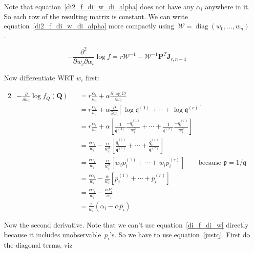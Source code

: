 \documentclass[nojss]{jss}
\DeclareMathOperator{\diag}{diag}
\begin{document}
Note that equation~\ref{di2_f_di_w_di_alpha} does not have any
$\alpha_i$ anywhere in it.  So each row of the resulting matrix is
constant.  We can write equation~\ref{di2_f_di_w_di_alpha} more compactly
using~$\mathcal{W} = \diag\left(w_0,\ldots,w_n\right)$.

\begin{equation}
-\frac{\partial^2}{\partial w_j\partial\alpha_i}\log f=
r\mathcal{W}^{-1} - \mathcal{W}^{-1}\mathbf{P}^T\mathbf{J}_{r,n+1}
\label{AW}
\end{equation}

Now differentiate WRT $w_i$ first:

\begin{alignat}{2}
& -\frac{\partial}{\partial w_i}\log f_Q(\mathbf{Q}) &&=
r\frac{\alpha_i}{w_i} +\alpha\frac{\partial\log\mathfrak{Q}}{\partial w_i}\\
& &&= r\frac{\alpha_i}{w_i} +\alpha\frac{\partial}{\partial w_i}\left[ \log\mathfrak{q}^{(1)} + \cdots+\log\mathfrak{q}^{(r)} \right]\\
& &&= r\frac{\alpha_i}{w_i}  + \alpha\left[
  \frac{1}{\mathfrak{q}^{(1)}}\frac{-q_i^{(1)}}{w_i^2}
  +\cdots+
  \frac{1}{\mathfrak{q}^{(r)}}\frac{-q_i^{(r)}}{w_i^2}
  \right]\\
& &&= \frac{r\alpha_i}{w_i} - \frac{\alpha}{w_i^2}\left[
  \frac{q_i^{(1)}}{\mathfrak{q}^{(1)}}
    +\cdots+
      \frac{q_i^{(r)}}{\mathfrak{q}^{(r)}}\right]\label{justq}\\
& &&= \frac{r\alpha_i}{w_i} - \frac{\alpha}{w_i^2}\left[
  w_ip_i^{(1)} +\cdots+  w_ip_i^{(r)}\right]
\qquad\mbox{because~$\mathfrak{p}=1/\mathfrak{q}$}\\
& &&= \frac{r\alpha_i}{w_i} - \frac{\alpha}{w_i}
  \left[ p_i^{(1)} +\cdots+ p_i^{(r)}\right]\\
& &&= \frac{r\alpha_i}{w_i} - \frac{\alpha P_i}{w_i}\label{di_f_di_w}\\
& &&= \frac{r}{w_i}(\alpha_i-\alpha\overline{p_i})\label{di_f_di_w2}
\end{alignat}


Now the second derivative.  Note that we can't use
equation~\ref{di_f_di_w} directly because it includes
unobservable~$p_i$'s.  So we have to use equation~\ref{justq}.  First
do the diagonal terms, viz
\end{document}

